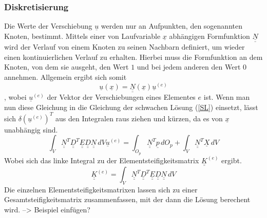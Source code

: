 \subsubsection{Diskretisierung}
Die Werte der Verschiebung $\underline{u}$ werden nur an Aufpunkten, den sogenannten Knoten, bestimmt. Mittels einer von Laufvariable $\underline{x}$ abhängigen Formfunktion $\underline{\underline{N}}$ wird der Verlauf von einem Knoten zu seinen Nachbarn definiert, um wieder einen kontinuierlichen Verlauf zu erhalten. Hierbei muss die Formfunktion an dem Knoten, von dem sie ausgeht, den Wert $1$  und bei jedem anderen den Wert $0$ annehmen. Allgemein ergibt sich somit
\begin{equation}
	\underline{u}(\underline{x})=\underline{\underline{N}}(\underline{x})\underline{u}^{(e)}
\end{equation}
, wobei $\underline{u}^{(e)}$ der Vektor der Verschiebungen eines Elementes $e$ ist.
Wenn man nun diese Gleichung in die Gleichung der schwachen Lösung (\ref{SL}) einsetzt, lässt sich $\delta(\underline{u}^{(e)})^T$ aus den Integralen raus ziehen und kürzen, da es von $\underline{x}$ unabhängig sind.
\begin{equation}
	\int_{V}^{}\underline{\underline{N}}^T\underline{\underline{D}}^T\underline{\underline{E}}\underline{\underline{D}}\underline{\underline{N}}\,dV\underline{u}^{(e)} = \int_{O_{p}}^{}\underline{\underline{N}}^T\underline{p}\,dO_p + \int_{V}^{}\underline{\underline{N}}^T\underline{X}\,dV
\end{equation}
Wobei sich das linke Integral zu der Elementsteifigkeitsmatrix $\underline{\underline{K}}^{(e)}$ ergibt.
\begin{equation}
	\underline{\underline{K}}^{(e)} = \int_{V}^{}\underline{\underline{N}}^T\underline{\underline{D}}^T\underline{\underline{E}}\underline{\underline{D}}\underline{\underline{N}}\,dV
\end{equation}
Die einzelnen Elementsteifigkeitsmatrixen lassen sich zu einer Gesamtsteifigkeitsmatrix zusammenfassen, mit der dann die Lösung berechent wird. --> Beispiel einfügen?